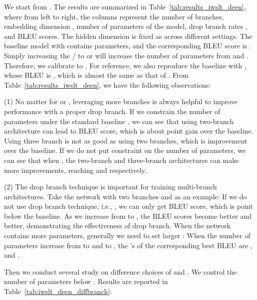 \documentclass{article}
\begin{document}
We start from . The results are summarized in Table~\ref{tab:results_iwslt_deen}, where from left to right, the columns represent the number of branches, embedding dimension , number of parameters of the model, drop branch rates , and BLEU scores. The hidden dimension  is fixed as  across different settings. The baseline model with  contains  parameters, and the corresponding BLEU score is . Simply increasing the / to  or  will increase the number of parameters from  and . Therefore, we calibrate  to . For reference, we also reproduce the baseline with , whose BLEU is , which is almost the same as that of . From Table~\ref{tab:results_iwslt_deen}, we have the following observations: 

\noindent(1) No matter for  or , leveraging more branches is always helpful to improve performance with a proper drop branch. If we constrain the number of parameters under the standard baseline , we can see that using two-branch architecture can lead to  BLEU score, which is about  point gain over the baseline. Using three branch is not as good as using two branches, which is  improvement over the baseline. If we do not put constraint on the number of parameters, we can see that when , the two-branch and three-branch architectures can make more improvements, reaching  and  respectively.

\noindent(2) The drop branch technique is important for training multi-branch architectures. Take the network with two branches and  as an example: If we do not use drop branch technique, i.e., , we can only get  BLEU score, which is  point below the baseline. As we increase  from  to , the BLEU scores become better and better, demonstrating the effectiveness of drop branch. When the network contains more parameters, generally we need to set larger : When the number of parameters increase from  to  and to , the 's of the corresponding best BLEU are ,  and . 

Then we conduct several study on difference choices of  and . We control the number of parameters below . Results are reported in Table~\ref{tab:iwslt_deen_diffbranch}:
\end{document}
